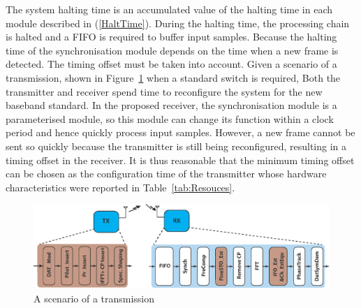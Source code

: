 The system halting time is an accumulated value of the halting time in each module described in (\ref{HaltTime}). During the halting time, the processing chain is halted and a FIFO is required to buffer input samples. Because the halting time of the synchronisation module depends on the time when a new frame is detected. The timing offset must be taken into account. Given a scenario of a transmission, shown in Figure~\ref{fig:tx-rx} when a standard switch is required, Both the transmitter and receiver spend time to reconfigure the system for the new baseband standard. In the proposed receiver, the synchronisation module is a parameterised module, so this module can change its function within a clock period and hence quickly process input samples. However, a new frame cannot be sent so quickly because the transmitter is still being reconfigured, resulting in a timing offset in the receiver. It is thus reasonable that the minimum timing offset can be chosen as the configuration time of the transmitter whose hardware characteristics were reported in Table~\ref{tab:Resouces}.
\begin{figure}
\centering
\includegraphics [width=1\columnwidth]{Figures/CR_Tx-Rx.eps}
\caption{A scenario of a transmission}
\label{fig:tx-rx}
\end{figure}

